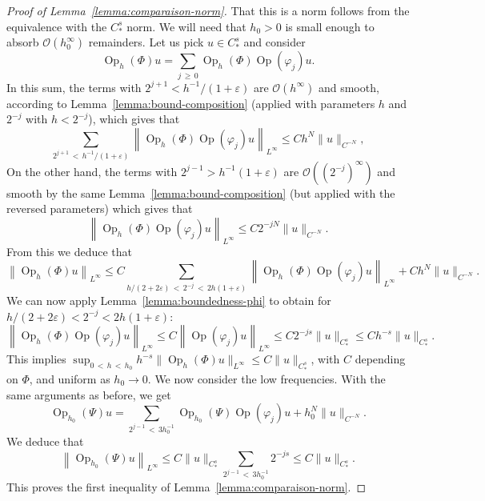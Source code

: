\documentclass[AHL,Unicode,longabstracts,published]{cedram}
\newcommand{\eps}{\varepsilon}
\newcommand{\clO}{\mathcal{O}}
\DeclareMathOperator{\Op}{Op}
\begin{document}
\begin{proof}[Proof of Lemma~\ref{lemma:comparaison-norm}]
That this is a norm follows from the equivalence with the $C^s_\ast$ norm. We will need that $h_0>0$ is small enough to absorb $\clO(h_0^\infty)$ remainders. Let us pick $u\in C^s_\ast$ and consider
\[
\Op_h(\Phi) u= \sum_{j\,\geq\,0} \Op_h(\Phi) \Op(\varphi_j) u.
\]
In this sum, the terms with $2^{j+1}< h^{-1} /(1+\eps)$ are $\clO(h^\infty)$ and smooth, according to Lemma~\ref{lemma:bound-composition} (applied with parameters $h$ and $2^{-j}$ with $h < 2^{-j}$), which gives that
\[
\sum_{2^{j+1}\,<\,h^{-1}/(1+\eps)} \left\|\Op_h(\Phi) \Op(\varphi_j) u\right\|_{L^\infty} \leq C h^N \|u\|_{C^{-N}},
\]
On the other hand, the terms with $2^{j-1} > h^{-1}(1+\eps)$ are $\clO((2^{-j})^\infty)$ and smooth by the same Lemma~\ref{lemma:bound-composition} (but applied with the reversed parameters) which gives that
\[
\left\|\Op_h(\Phi) \Op(\varphi_j) u\right\|_{L^\infty} \leq C 2^{-jN} \|u\|_{C^{-N}}.
\]
From this we deduce that
\[
\left\|\Op_h(\Phi) u\right\|_{L^\infty} \leq C \sum_{h/(2+2\eps)\,<\,2^{-j}\,<\,2 h(1+\eps)} \left\| \Op_h(\Phi)\Op(\varphi_j) u\right\|_{L^\infty} + C h^N \|u\|_{C^{-N}}.
\]
We can now apply Lemma~\ref{lemma:boundedness-phi} to obtain for $h/(2+2\eps)< 2^{-j} < 2 h(1+\eps)$:
\[
\left\|\Op_h(\Phi)\Op(\varphi_j)u\right\|_{L^\infty} \leq C\left\|\Op(\varphi_j)u\right\|_{L^\infty} \leq C 2^{-js}\|u\|_{C^s_*} \leq C h^{-s}\|u\|_{C^s_*}.
\]
This implies $\sup_{0\,<\,h\,<\,h_0} h^{-s}\| \Op_h(\Phi)u \|_{L^\infty} \leq C \|u\|_{C^s_\ast}$, with $C$ depending on $\Phi$, and uniform as $h_0 \to 0$. We now consider the low frequencies. With the same arguments as before, we get
\[
\Op_{h_0}(\Psi)u = \sum_{2^{j-1}\,<\,3h_0^{-1}} \Op_{h_0}(\Psi) \Op(\varphi_j) u + h_0^N\|u\|_{C^{-N}}.
\]
We deduce that
\[
\left\| \Op_{h_0}(\Psi) u \right\|_{L^\infty} \leq C \| u\|_{C^s_\ast} \sum_{2^{j-1}\,< \,3h_0^{-1}} 2^{-js} \leq C \| u \|_{C^s_\ast}.
\]
This proves the first inequality of Lemma~\ref{lemma:comparaison-norm}.


\end{proof}
\end{document}
